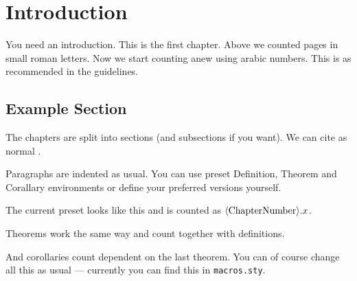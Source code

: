 \chapter{Introduction}
You need an introduction. This is the first chapter. Above we counted pages in small roman letters. Now we start counting anew using arabic numbers. This is as recommended in the guidelines.
\section{Example Section}
The chapters are split into sections (and subsections if you want). We can cite as normal \cite{Baez:9705009}.

Paragraphs are indented as usual. You can use preset Definition, Theorem and Corallary environments or define your preferred versions yourself.
\begin{mydef}[A Definition]
The current preset looks like this and is counted as $\langle{\rm Chapter Number}\rangle.x$.
\end{mydef}
\begin{mythm}[A Theorem]
Theorems work the same way and count together with definitions.
\end{mythm}
\begin{mycor}[A corollary]
And corollaries count dependent on the last theorem. You can of course change all this as usual --- currently you can find this in \texttt{macros.sty}.
\end{mycor}